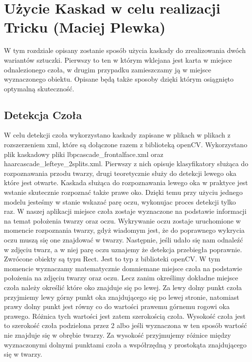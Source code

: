 \section{Użycie Kaskad w celu realizacji Tricku (Maciej Plewka)}

W tym rozdziale opisany zostanie sposób użycia kaskady do zrealizowania dwóch wariantów sztuczki. Pierwszy to ten w którym wklejana jest karta w miejsce odnalezionego czoła, w drugim przypadku zamieszczamy ją w miejsce wyznaczonego obiektu. Opisane będą także sposoby dzięki którym osiągnięto optymalną skuteczność.

\subsection{Detekcja Czoła}

W celu detekcji czoła wykorzystano kaskady zapisane w plikach w plikach z rozszerzeniem xml, które są dołączone razem z biblioteką openCV. Wykorzystano plik kaskadowy pliki lbpcascade\_frontalface.xml oraz haarcascade\_lefteye\_2splits.xml.
Pierwszy z nich opisuje klasyfikatory służąca do rozpoznawania przodu twarzy, drugi 
teoretycznie służy do detekcji lewego oka które jest otwarte. Kaskada służąca do rozpoznawania lewego oka w praktyce jest wstanie skutecznie rozpoznać także prawe oko. Dzięki temu przy użyciu jednego modelu jesteśmy w stanie wskazać parę oczu, wykonujac proces detekcji tylko raz. W naszej aplikacji miejsce czoła zostaje wyznaczone na podstawie informacji na temat położenia twarzy oraz oczu. Wykrywanie oczu zostaje uruchomione w momencie rozpoznania twarzy, gdyż wiadomym jest, że do poprawnego wykrycia oczu muszą się one znajdować w twarzy. 
Następnie, jeśli udało się nam odnaleźć w zdjęciu twarz, a w niej parę oczu uznajemy że detekcja przebiegła poprawnie. Zwrócone obiekty są typu Rect. Jest to typ z biblioteki openCV. W tym momencie wyznaczamy matematycznie domniemane miejsce czoła na podstawie położenia na zdjęciu twarzy oraz oczu. Lecz zanim określimy dokładne miejsce czoła należy określić które oko znajduje się po lewej.
Za lewy dolny punkt czoła przyjmiemy lewy górny punkt oka znajdującego się po lewej stronie, natomiast prawy dolny punkt jest równy co do wartości prawemu górnemu rogowi oka prawego. Różnica tych wartości jest zatem szerokością czoła. Wysokość czoła jest to szerokość czoła podzielona przez 2 albo jeśli wyznaczona w ten sposób wartość nie znajduje się w obrębie twarzy. Za wysokość przyjmujemy różnice między wyznaczonymi dolnymi punktami czoła a współrzędną y prostokąta znajdującego się w twarzy.


